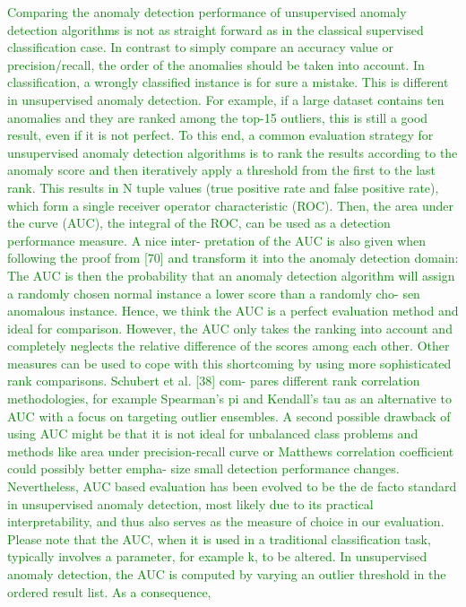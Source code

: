 \textcolor{green}
{Comparing the anomaly detection performance of unsupervised anomaly detection algorithms
is not as straight forward as in the classical supervised classification case. In contrast to simply
compare an accuracy value or precision/recall, the order of the anomalies should be taken into
account. In classification, a wrongly classified instance is for sure a mistake. This is different in
unsupervised anomaly detection. For example, if a large dataset contains ten anomalies and
they are ranked among the top-15 outliers, this is still a good result, even if it is not perfect. To
this end, a common evaluation strategy for unsupervised anomaly detection algorithms is to
rank the results according to the anomaly score and then iteratively apply a threshold from the
first to the last rank. This results in N tuple values (true positive rate and false positive rate),
which form a single receiver operator characteristic (ROC). Then, the area under the curve
(AUC), the integral of the ROC, can be used as a detection performance measure. A nice inter-
pretation of the AUC is also given when following the proof from [70] and transform it into
the anomaly detection domain: The AUC is then the probability that an anomaly detection
algorithm will assign a randomly chosen normal instance a lower score than a randomly cho-
sen anomalous instance. Hence, we think the AUC is a perfect evaluation method and ideal for
comparison. However, the AUC only takes the ranking into account and completely neglects
the relative difference of the scores among each other. Other measures can be used to cope
with this shortcoming by using more sophisticated rank comparisons. Schubert et al. [38] com-
pares different rank correlation methodologies, for example Spearman’s pi and Kendall’s tau as an
alternative to AUC with a focus on targeting outlier ensembles. A second possible drawback of
using AUC might be that it is not ideal for unbalanced class problems and methods like area
under precision-recall curve or Matthews correlation coefficient could possibly better empha-
size small detection performance changes. Nevertheless, AUC based evaluation has been
evolved to be the de facto standard in unsupervised anomaly detection, most likely due to its
practical interpretability, and thus also serves as the measure of choice in our evaluation.
Please note that the AUC, when it is used in a traditional classification task, typically
involves a parameter, for example k, to be altered. In unsupervised anomaly detection, the
AUC is computed by varying an outlier threshold in the ordered result list. As a consequence,
}
